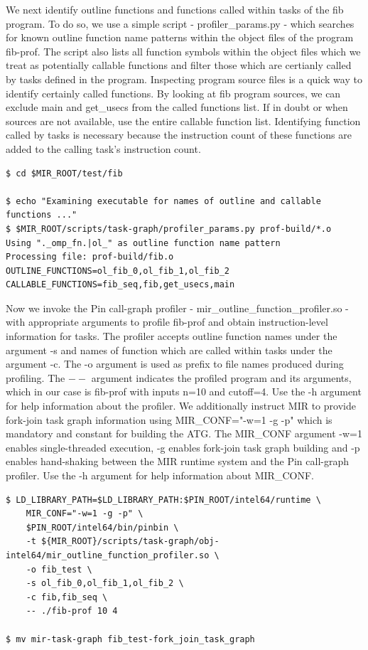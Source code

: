 \documentclass[11pt,a4paper,notitlepage]{article}
\begin{document}
We next identify outline functions and functions called within tasks of the fib program. 
To do so, we use a simple script - profiler\_params.py - which searches for known outline function name patterns within the object files of the program fib-prof. 
The script also lists all function symbols within the object files which we treat as potentially callable functions and filter those which are certianly called by tasks defined in the program. 
Inspecting program source files is a quick way to identify certainly called functions. 
By looking at fib program sources, we can exclude main and get\_usecs from the called functions list.
If in doubt or when sources are not available, use the entire callable function list.
Identifying function called by tasks is necessary because the instruction count of these functions are added to the calling task's instruction count.

\begin{lstlisting}[style=BashInputStyle]
$ cd $MIR_ROOT/test/fib

$ echo "Examining executable for names of outline and callable functions ..."
$ $MIR_ROOT/scripts/task-graph/profiler_params.py prof-build/*.o
Using "._omp_fn.|ol_" as outline function name pattern
Processing file: prof-build/fib.o
OUTLINE_FUNCTIONS=ol_fib_0,ol_fib_1,ol_fib_2
CALLABLE_FUNCTIONS=fib_seq,fib,get_usecs,main
\end{lstlisting}

Now we invoke the Pin call-graph profiler - mir\_outline\_function\_profiler.so - with appropriate arguments to profile fib-prof and obtain instruction-level information for tasks.
The profiler accepts outline function names under the argument -s and names of function which are called within tasks under the argument -c. 
The -o argument is used as prefix to file names produced during profiling.
The $--$ argument indicates the profiled program and its arguments, which in our case is fib-prof with inputs n=10 and cutoff=4.
Use the -h argument for help information about the profiler.
We additionally instruct MIR to provide fork-join task graph information using MIR\_CONF="-w=1 -g -p" which is mandatory and constant for building the ATG.
The MIR\_CONF argument -w=1 enables single-threaded execution, -g enables fork-join task graph building and -p enables hand-shaking between the MIR runtime system and the Pin call-graph profiler.
Use the -h argument for help information about MIR\_CONF.

\begin{lstlisting}[style=BashInputStyle]
$ LD_LIBRARY_PATH=$LD_LIBRARY_PATH:$PIN_ROOT/intel64/runtime \
    MIR_CONF="-w=1 -g -p" \
    $PIN_ROOT/intel64/bin/pinbin \
    -t ${MIR_ROOT}/scripts/task-graph/obj-intel64/mir_outline_function_profiler.so \
    -o fib_test \
    -s ol_fib_0,ol_fib_1,ol_fib_2 \
    -c fib,fib_seq \
    -- ./fib-prof 10 4

$ mv mir-task-graph fib_test-fork_join_task_graph
\end{lstlisting}
\end{document}

